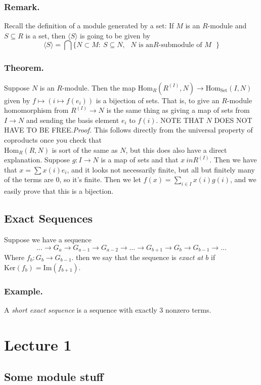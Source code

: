 \documentclass{article}
\newcommand{\beginproof}{\vspace{10pt}\newline\textit{Proof.}\hspace{1em}}
\begin{document}
\subsubsection{Remark.} Recall the definition of a module generated by a set: If
$M$ is an $R$-module and $S\subseteq R$ is a set, then $\langle S\rangle$ is
going to be given by 
\[ \langle S \rangle = \bigcap\{N\subset M: \: S\subseteq N, \text{ $N$ is an
$R$-submodule of $M$ }\}\]
\subsubsection{Theorem.} Suppose $N$ is an $R$-module. Then the map
$\text{Hom}_R(R^{(I)}, N) \to \text{Hom}_{\text{Set}}(I, N)$ given by $f \mapsto
(i\mapsto f(e_i))$ is a bijection of sets. That is, to give an $R$-module
homomorphism from $R^{(I)}\to N$ is the same thing as giving a map of sets
from $I\to N$ and sending the basis element $e_i$ to $f(i)$. NOTE THAT $N$ DOES
NOT HAVE TO BE FREE.\beginproof
This follows directly from the universal property of coproducts once you check
that\\ $\text{Hom}_R(R,N)$ is sort of the same as $N$, but this does also have a
direct explanation. Suppose $g: I \to N$ is a map of sets and that $x\ in
R^{(I)}$. Then we have that $x = \sum x(i)e_i$, and it looks not necessarily
finite, but all but finitely many of the terms are $0$, so it's finite. Then we
let $f(x) = \sum_{i \in I} x(i) g(i)$, and we easily prove that this is a
bijection.
\subsection{Exact Sequences} Suppose we have a sequence 
\[\hdots \to G_a \to G_{a-1} \to G_{a-2} \to \hdots \to G_{b+1} \to G_{b} \to
G_{b-1} \to \hdots\]
Where $f_{b}: G_b \to G_{b-1}$. then we say that the sequence is \textit{exact
at $b$} if $\text{Ker}(f_b) = \text{Im}(f_{b+1})$.
\subsubsection{Example.} A \textit{short exact sequence} is a sequence with
exactly 3 nonzero terms.
\section{Lecture 1}
\subsection{Some module stuff}
\end{document}
